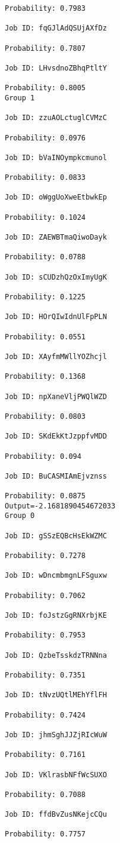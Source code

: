 \documentclass[11pt]{article}
\begin{document}
\begin{Verbatim}[commandchars=\\\{\}]
Probability: 0.7983

Job ID: fqGJlAdQSUjAXfDz

Probability: 0.7807

Job ID: LHvsdnoZBhqPtltY

Probability: 0.8005
Group 1

Job ID: zzuAOLctuglCVMzC

Probability: 0.0976

Job ID: bVaINOympkcmunol

Probability: 0.0833

Job ID: oWggUoXweEtbwkEp

Probability: 0.1024

Job ID: ZAEWBTmaQiwoDayk

Probability: 0.0788

Job ID: sCUDzhQzOxImyUgK

Probability: 0.1225

Job ID: HOrQIwIdnUlFpPLN

Probability: 0.0551

Job ID: XAyfmMWllYOZhcjl

Probability: 0.1368

Job ID: npXaneVljPWQlWZD

Probability: 0.0803

Job ID: SKdEkKtJzppfvMDD

Probability: 0.094

Job ID: BuCASMIAmEjvznss

Probability: 0.0875
Output=-2.1681890454672033
Group 0

Job ID: gSSzEQBcHsEkWZMC

Probability: 0.7278

Job ID: wDncmbmgnLFSguxw

Probability: 0.7062

Job ID: foJstzGgRNXrbjKE

Probability: 0.7953

Job ID: QzbeTsskdzTRNNna

Probability: 0.7351

Job ID: tNvzUQtlMEhYflFH

Probability: 0.7424

Job ID: jhmSghJJZjRIcWuW

Probability: 0.7161

Job ID: VKlrasbNFfWcSUXO

Probability: 0.7088

Job ID: ffdBvZusNKejcCQu

Probability: 0.7757


\end{Verbatim}
\end{document}
